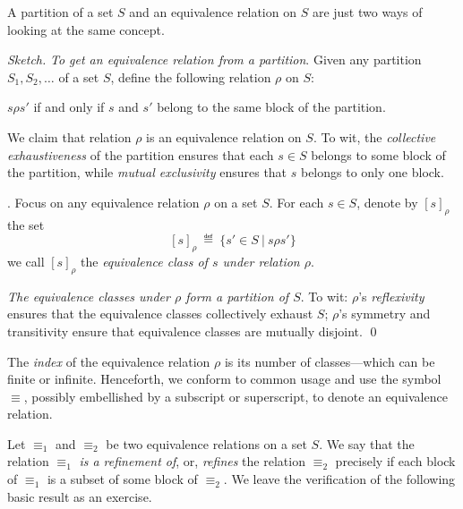 \begin{prop}
A partition of a set $S$ and an equivalence relation on $S$ are just two ways of looking at the same concept.
\end{prop}

\begin{proof}[Sketch]
{\it To get an equivalence relation from a partition}.
Given any partition $S_1, S_2, \ldots$ of a set $S$, define the following relation $\rho$ on $S$:

\smallskip

$s \rho s'$ if and only if $s$ and $s'$ belong to the same block of the partition.

\smallskip

\noindent
We claim that relation $\rho$ is an equivalence relation on $S$.  To wit, the {\em collective exhaustiveness} of the partition ensures that each $s \in S$ belongs to some block of the partition, while {\em mutual exclusivity} ensures that $s$ belongs to only one block.

\medskip
{}.
Focus on any equivalence relation $\rho$ on a set $S$.  For each $s \in S$, denote by $[s]_\rho$ the set
\[ [s]_\rho \ \eqdef \ \{ s' \in S \ | \ s \rho s' \} \]
we call $[s]_\rho$ the {\it equivalence class of $s$ under relation $\rho$}.

\smallskip

\noindent
{\em The equivalence classes under $\rho$ form a partition of $S$}.
To wit: $\rho$'s {\em reflexivity} ensures that the equivalence classes collectively exhaust $S$; $\rho$'s symmetry and transitivity ensure that equivalence classes are mutually disjoint.  \qed
\end{proof}

  
  
The {\it index} of the equivalence relation $\rho$ is its number of classes---which can be finite or infinite.  Henceforth, we conform to common usage and use the symbol $\equiv$, possibly embellished by a subscript or superscript, to denote an equivalence relation.

\smallskip


Let $\equiv_1$ and $\equiv_2$ be two equivalence relations on a set $S$.  We say that the relation $\equiv_1$ {\em is a refinement of}, or, {\em refines} the relation $\equiv_2$ precisely if each block of $\equiv_1$ is a subset of some block of $\equiv_2$.  We leave the verification of the following basic result as an exercise.


